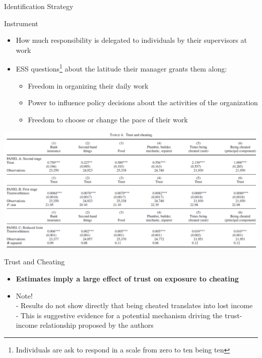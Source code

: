 \documentclass[pdftex,12pt,xcolor=pdftex,table]{beamer}
\begin{document}
\begin{frame}{Identification Strategy}
        \begin{center}
        \begin{description}
         \Large \item[Instrument]
        \end{description}
    \end{center}
    \begin{itemize}
        \item How much responsibility is delegated to individuals by their supervisors at work
        \item ESS questions\footnote{Individuals are ask to respond in a scale from zero to ten being ten} about the latitude their manager grants them along:
            \begin{itemize}
                \item Freedom in organizing their daily work
                \item Power to influence policy decisions about the activities of the organization
                \item Freedom to choose or change the pace of their work
            \end{itemize}
    \end{itemize}
\end{frame}
\begin{frame}{}
    \begin{center}
        \includegraphics[scale=0.44]{table_4.PNG}
    \end{center}
\end{frame}

\begin{frame}{Trust and Cheating}
    \begin{center}
        \begin{description}
         \Huge \item[Findings]
        \end{description}
    \end{center}
    \begin{itemize}
        \item \textbf{Estimates imply a large effect of trust on exposure to cheating} \pause
        \item Note! \\
        - Results do not show directly that being cheated translates into lost income\\
        - This is suggestive evidence for a potential mechanism driving the trust-income relationship proposed by the authors
    \end{itemize}
\end{frame}
\end{document}
